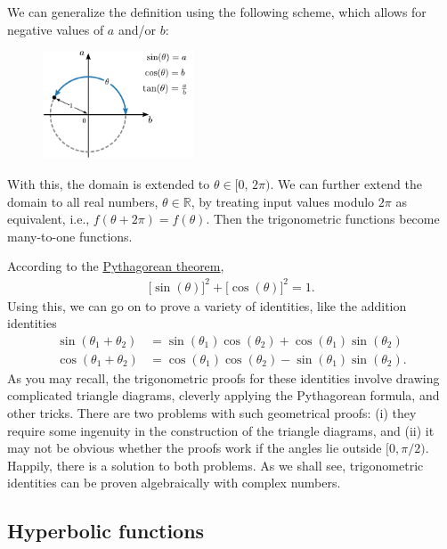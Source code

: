 \documentclass[10pt,a4paper]{article}
\begin{document}
We can generalize the definition using the following scheme, which
allows for negative values of $a$ and/or $b$:

\begin{figure}[h!]
  \centering\includegraphics[width=0.4\textwidth]{trigonometry2}
\end{figure}

\noindent
With this, the domain is extended to $\theta \in [0,\,2\pi)$. We can
  further extend the domain to all real numbers, $\theta \in
  \mathbb{R}$, by treating input values modulo $2\pi$ as equivalent,
  i.e., $f(\theta + 2\pi) = f(\theta)$.  Then the trigonometric
  functions become many-to-one functions.

According to the \href{http://www.faculty.umb.edu/gary_zabel/Courses/Phil%20281b/Philosophy%20of%20Magic/Arcana/Neoplatonism/Pythagoras/index.shtml.html}{Pythagorean theorem},
\begin{align}
  \big[\sin(\theta)\big]^2 + \big[\cos(\theta)\big]^2 = 1.
\end{align}
Using this, we can go on to prove a variety of identities, like the
addition identities
\begin{align}
  \sin(\theta_1 + \theta_2) &= \sin(\theta_1) \cos(\theta_2) + \cos(\theta_1)\sin(\theta_2) \\
  \cos(\theta_1 + \theta_2) &= \cos(\theta_1) \cos(\theta_2) - \sin(\theta_1)\sin(\theta_2).
\end{align}
As you may recall, the trigonometric proofs for these identities
involve drawing complicated triangle diagrams, cleverly applying the
Pythagorean formula, and other tricks.  There are two problems with
such geometrical proofs: (i) they require some ingenuity in the
construction of the triangle diagrams, and (ii) it may not be obvious
whether the proofs work if the angles lie outside
$[0,\pi/2)$. Happily, there is a solution to both problems. As we
  shall see, trigonometric identities can be proven algebraically with
  complex numbers.

\subsection{Hyperbolic functions}\label{hyperbolic-functions}
\end{document}
